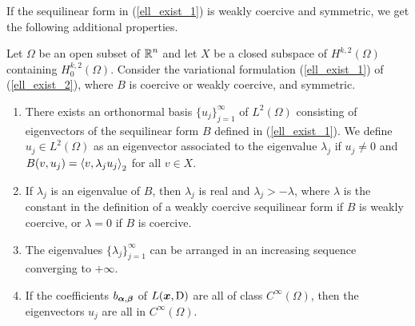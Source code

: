 If the sequilinear form in (\ref{ell_exist_1}) is weakly coercive and
symmetric, we get the following additional properties.

\begin{theorem} \label{ell_exist_th3}
Let $\Omega$ be an open subset of $\displaystyle \mathbb{R}^n$ and let $X$ be a closed
subspace of $\displaystyle H^{k,2}(\Omega)$ containing
$\displaystyle H^{k,2}_0(\Omega)$.
Consider the variational formulation (\ref{ell_exist_1}) of
(\ref{ell_exist_2}), where $B$ is coercive or weakly coercive, and symmetric.
\begin{enumerate}
\item There exists an orthonormal basis $\displaystyle \{u_j\}_{j=1}^\infty$ of
$\displaystyle L^2(\Omega)$ consisting of eigenvectors of the sequilinear form
$B$ defined in (\ref{ell_exist_1}).  We define
$\displaystyle u_j \in L^2(\Omega)$ as
an eigenvector associated to the eigenvalue $\lambda_j$ if $u_j\neq 0$
and $B(v,u_j)= \left\langle{v} , {\lambda_j u_j}\right\rangle_2$ for all $v\in X$.
\item If $\lambda_j$ is an eigenvalue of $B$, then $\lambda_j$ is real
and $\lambda_j > -\lambda$, where $\lambda$ is the constant in the
definition of a weakly coercive sequilinear form if $B$ is weakly
coercive, or $\lambda =0$ if $B$ is coercive.
\item The eigenvalues $\displaystyle \{\lambda_j\}_{j=1}^\infty$ can
be arranged in an increasing sequence converging to $+\infty$.
\item If the coefficients $b_{{\bm{\alpha}},{\bm{\beta}}}$ of
$L({\bm{x}},\operatorname{D})$ are all of class $\displaystyle C^\infty(\Omega)$,
then the eigenvectors $u_j$ are all in $\displaystyle C^\infty(\Omega)$.
\end{enumerate}
\end{theorem}

